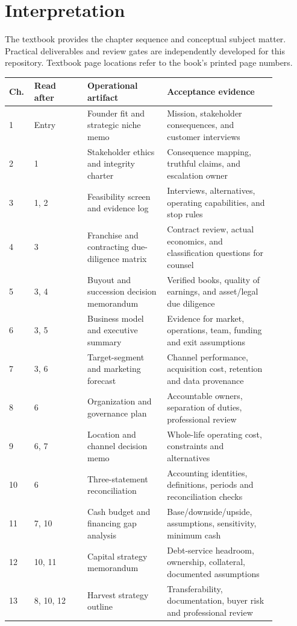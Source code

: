 \documentclass[11pt]{article}
\begin{document}
\SuiteOpen
\section{Interpretation}
The textbook provides the chapter sequence and conceptual subject matter. Practical deliverables and review gates are independently developed for this repository. Textbook page locations refer to the book's printed page numbers.
\small\begin{longtable}{p{0.06\linewidth}p{0.18\linewidth}p{0.27\linewidth}p{0.37\linewidth}}\toprule Ch. & Read after & Operational artifact & Acceptance evidence\\\midrule\endhead
1 & Entry & Founder fit and strategic niche memo & Mission, stakeholder consequences, and customer interviews\\
2 & 1 & Stakeholder ethics and integrity charter & Consequence mapping, truthful claims, and escalation owner\\
3 & 1, 2 & Feasibility screen and evidence log & Interviews, alternatives, operating capabilities, and stop rules\\
4 & 3 & Franchise and contracting due-diligence matrix & Contract review, actual economics, and classification questions for counsel\\
5 & 3, 4 & Buyout and succession decision memorandum & Verified books, quality of earnings, and asset/legal due diligence\\
6 & 3, 5 & Business model and executive summary & Evidence for market, operations, team, funding and exit assumptions\\
7 & 3, 6 & Target-segment and marketing forecast & Channel performance, acquisition cost, retention and data provenance\\
8 & 6 & Organization and governance plan & Accountable owners, separation of duties, professional review\\
9 & 6, 7 & Location and channel decision memo & Whole-life operating cost, constraints and alternatives\\
10 & 6 & Three-statement reconciliation & Accounting identities, definitions, periods and reconciliation checks\\
11 & 7, 10 & Cash budget and financing gap analysis & Base/downside/upside, assumptions, sensitivity, minimum cash\\
12 & 10, 11 & Capital strategy memorandum & Debt-service headroom, ownership, collateral, documented assumptions\\
13 & 8, 10, 12 & Harvest strategy outline & Transferability, documentation, buyer risk and professional review\\

\end{longtable}
\end{document}
